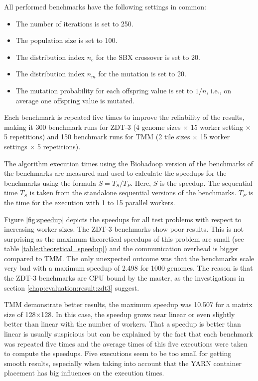 All performed benchmarks have the following settings in common:
\begin{itemize}
  \item The number of iterations is set to 250.
  \item The population size is set to 100.
  \item The distribution index $n_c$ for the SBX crossover is set to 20.
  \item The distribution index $n_m$ for the mutation is set to 20.
  \item The mutation probability for each offspring value is set to $1/n$, i.e., on average one offspring value is mutated.
\end{itemize}

Each benchmark is repeated five times to improve the reliability of the results, making it 300 benchmark runs for ZDT-3 (4 genome sizes $\times$ 15 worker setting $\times$ 5 repetitions) and 150 benchmark runs for TMM (2 tile sizes $\times$ 15 worker settings $\times$ 5 repetitions).




The algorithm execution times using the Biohadoop version of the benchmarks of the benchmarks are measured and used to calculate the speedups for the benchmarks using the formula $S = T_S / T_P$. Here, $S$ is the speedup. The sequential time $T_S$ is taken from the standalone sequential versions of the benchmarks. $T_P$ is the time for the execution with 1 to 15 parallel workers.

Figure \ref{fig:speedup} depicts the speedups for all test problems with respect to increasing worker sizes. The ZDT-3 benchmarks show poor results. This is not surprising as the maximum theoretical speedups of this problem are small (see table \ref{table:theoretical_speedup}) and the communication overhead is bigger compared to TMM. The only unexpected outcome was that the benchmarks scale very bad with a maximum speedup of 2.498 for 1000 genomes. The reason is that the ZDT-3 benchmarks are CPU bound by the master, as the investigations in section \ref{chap:evaluation:result:zdt3} suggest.

TMM demonstrate better results, the maximum speedup was 10.507 for a matrix size of 128$\times$128. In this case, the speedup grows near linear or even slightly better than linear with the number of workers. That a speedup is better than linear is usually suspicious but can be explained by the fact that each benchmark was repeated five times and the average times of this five executions were taken to compute the speedups. Five executions seem to be too small for getting smooth results, especially when taking into account that the YARN container placement has big influences on the execution times.

